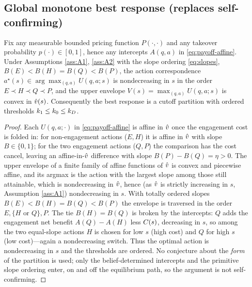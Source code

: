 \subsection{Global monotone best response (replaces self-confirming)}

\begin{lemma}
\label{lem:monotone}
Fix any measurable bounded pricing function $P(\cdot,\cdot)$ and any takeover
probability $p(\cdot)\in[0,1]$, hence any intercepts $A(q,a)$ in
\eqref{eq:payoff-affine}. Under Assumptions \ref{ass:A1}, \ref{ass:A2} with the
slope ordering \eqref{eq:slopes}, $B(E)<B(H)=B(Q)<B(P)$, the action
correspondence $a^\star(s)\in\arg\max_{(q,a)}U(q,a;s)$ is nondecreasing in $s$ in
the order $E\prec H\prec Q\prec P$, and the upper envelope
$V(s)=\max_{(q,a)}U(q,a;s)$ is convex in $\hat{v}(s)$. Consequently the best
response is a cutoff partition with ordered thresholds $k_1\le k_0\le k_D$.
\end{lemma}

\begin{proof}
Each $U(q,a;\cdot)$ in \eqref{eq:payoff-affine} is affine in $\hat{v}$ once the
engagement cost is folded in: for non-engagement actions ($E,H$) it is affine in
$\hat{v}$ with slope $B\in\{0,1\}$; for the two engagement actions ($Q,P$) the
comparison has the cost cancel, leaving an affine-in-$\hat{v}$ difference with slope
$B(P)-B(Q)=\eta>0$. The upper envelope of a finite family of affine functions of
$\hat{v}$ is convex and piecewise affine, and its argmax is the action with the
largest slope among those still attainable, which is nondecreasing in $\hat{v}$,
hence (as $\hat{v}$ is strictly increasing in $s$, Assumption \ref{ass:A1})
nondecreasing in $s$. With totally ordered slopes $B(E)<B(H)=B(Q)<B(P)$ the
envelope is traversed in the order $E,\{H\text{ or }Q\},P$. The tie
$B(H)=B(Q)$ is broken by the intercepts: $Q$ adds the engagement net benefit
$A(Q)-A(H)$ less $C(s)$, decreasing in $s$, so among the two equal-slope
actions $H$ is chosen for low $s$ (high cost) and $Q$ for high $s$ (low
cost)---again a nondecreasing switch. Thus the optimal action is nondecreasing in
$s$ and the thresholds are ordered. No conjecture about the \emph{form} of the
partition is used; only the belief-determined intercepts and the primitive slope
ordering enter, on and off the equilibrium path, so the argument is not
self-confirming.
\end{proof}

